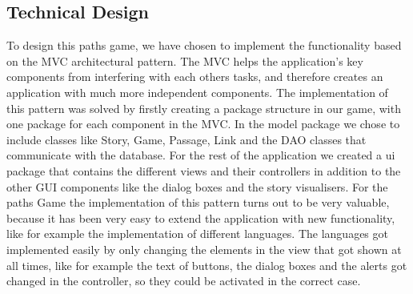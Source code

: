 \documentclass[British]{article}
\begin{document}
\subsection{Technical Design}
To design this paths game, we have chosen to implement the functionality based on the MVC architectural pattern. The MVC helps the application's key components from interfering with each others tasks, and therefore creates an application with much more independent components. The implementation of this pattern was solved by firstly creating a package structure in our game, with one package for each component in the MVC. In the model package we chose to include classes like Story, Game, Passage, Link and the DAO classes that communicate with the database. For the rest of the application we created a ui package that contains the different views and their controllers in addition to the other GUI components like the dialog boxes and the story visualisers. For the paths Game the implementation of this pattern turns out to be very valuable, because it has been very easy to extend the application with new functionality, like for example the implementation of different languages. The languages got implemented easily by only changing the elements in the view that got shown at all times, like for example the text of buttons, the dialog boxes and the alerts got changed in the controller, so they could be activated in the correct case. 
\end{document}
